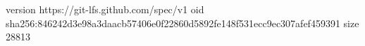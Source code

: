 version https://git-lfs.github.com/spec/v1
oid sha256:846242d3e98a3daacb57406e0f22860d5892fe148f531ecc9ec307afef459391
size 28813
